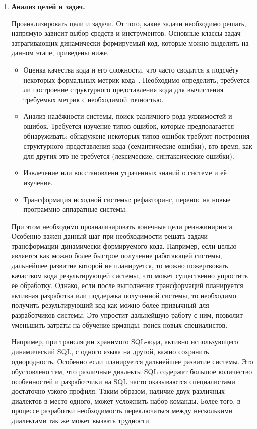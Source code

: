 \begin{enumerate}
  \item \textbf{Анализ целей и задач.}
  
  Проанализировать цели и задачи. От того, какие задачи необходимо решать, напрямую зависит выбор средств и инструментов. Основные классы задач затрагивающих динамически формируемый код, которые можно выделить на данном этапе, приведены ниже.
  
  \begin{itemize}
    \item Оценка качества кода и его сложности, что часто сводится к подсчёту некоторых формальных метрик кода~\cite{SoftwareMetrics, DSQLQualityMesureBIG}. Необходимо определить, требуется ли построение структурного представления кода для вычисления требуемых метрик с необходимой точностью.
    \item Анализ надёжности системы, поиск различного рода уязвимостей и ошибок. Требуется изучение типов ошибок, которые предполагается обнаруживать: обнаружене некоторых типов ошибок требуют построения структурного представления кода (семантические ошибки), вто время, как для других это не требуется (лексические, синтаксические ошибки).
    \item Извлечение или восстановлени утраченных знаний о системе и её изучение.
    \item Трансформация исходной системы: рефакторинг, перенос на новые программно-аппаратные системы.
  \end{itemize}
  
  При этом необходимо проанализировать конечные цели реинжиниринга. Особенно важен данный шаг при необходимости решать задачи трансформации динамически формируемого кода. Например, если целью является как можно более быстрое получение работающей системы, дальнейшее развитие которой не планируется, то можно пожертвовать качаством кода результирующей системы, что может существенно упростить её обработку. Однако, если после выполнения трансформаций планируется активная разработка или поддержка полученной системы, то необходимо получить результирующий код как можно более привычный для разработчиков системы. Это упростит дальнейшую работу с ним, позволит уменьшить затраты на обучение крманды, поиск новых специалистов.
  
  Например, при трансляции хранимого SQL-кода, активно использующего динамический SQL, с одного языка на другой, важно сохранить однородность. Особенно если планируется дальнейшее развитие системы. Это обусловлено тем, что различные диалекты SQL содержат большое количество особенностей и разработчики на SQL часто оказываются специалистами достаточно узкого профиля. Таким образом, наличие двух различных диалектов в место одного, может усложнить набор команды. Более того, в процессе разработки необходимость переключаться между несколькими диалектами так же может вызвать трудности.
  

\end{enumerate}
